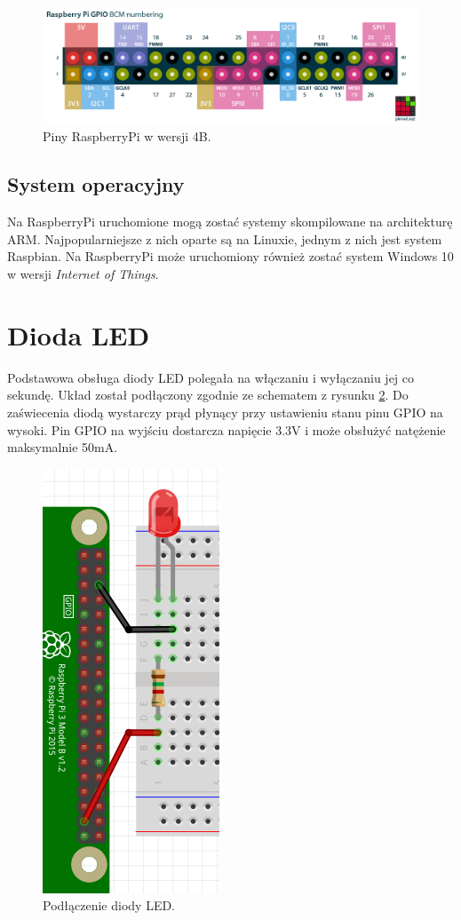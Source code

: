 \documentclass[12pt]{article}
\begin{document}
\begin{figure}[h]
  \centering
  \includegraphics[width=\linewidth]{raspberry-pi-pinout}
  \caption{Piny RaspberryPi w wersji 4B\cite{pinout}.}
  \label{raspi:2}
\end{figure}

\subsection{System operacyjny}
Na RaspberryPi uruchomione mogą zostać systemy skompilowane na architekturę ARM. Najpopularniejsze z nich oparte są na Linuxie, jednym z nich jest system Raspbian\cite{raspbian}. Na RaspberryPi może uruchomiony również zostać system Windows 10 w wersji \textit{Internet of Things}\cite{w10iot}.

\section{Dioda LED}
Podstawowa obsługa diody LED polegała na włączaniu i wyłączaniu jej co sekundę. Układ został podłączony zgodnie ze schematem z rysunku \ref{sch:1}. Do zaświecenia diodą wystarczy prąd płynący przy ustawieniu stanu pinu GPIO na wysoki. Pin GPIO na wyjściu dostarcza napięcie 3.3V i może obsłużyć natężenie maksymalnie 50mA\cite{raspi:power}.

\begin{figure}[h]
  \centering
  \includegraphics[height=0.4\linewidth]{sch1}
  \caption{Podłączenie diody LED.}
  \label{sch:1}
\end{figure}
\end{document}
